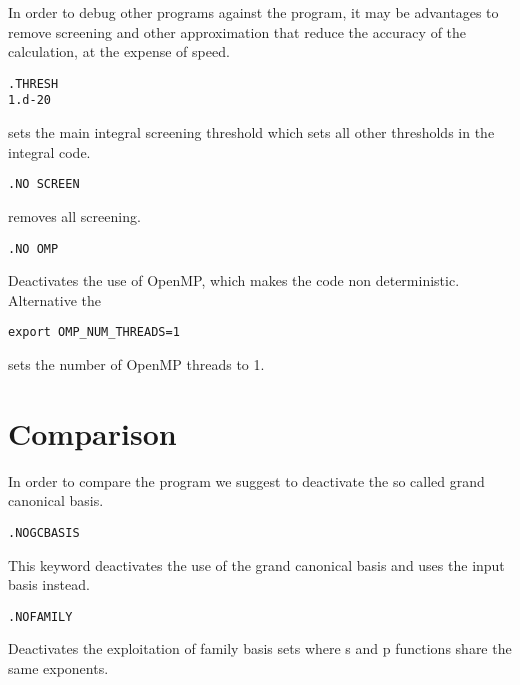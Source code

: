 In order to debug other programs against the {\lsdalton} program, it may be advantages to remove screening and other approximation that reduce the accuracy of the calculation, at the expense of speed.

\begin{verbatim}
.THRESH
1.d-20
\end{verbatim}
sets the main integral screening threshold which sets all other thresholds in the integral code. 
\begin{verbatim}
.NO SCREEN
\end{verbatim}
removes all screening. 
\begin{verbatim}
.NO OMP 
\end{verbatim}
Deactivates the use of OpenMP, which makes the code non deterministic. Alternative the 
\begin{verbatim}
export OMP_NUM_THREADS=1
\end{verbatim}
sets the number of OpenMP threads to 1.

\section{Comparison}

In order to compare the {\lsdalton} program
we suggest to deactivate the so called grand canonical basis. 
\begin{verbatim}
.NOGCBASIS
\end{verbatim}
This keyword deactivates the use of the grand canonical basis and uses the input basis instead. 
\begin{verbatim}
.NOFAMILY
\end{verbatim}
Deactivates the exploitation of family basis sets where s and p functions share the same exponents. 






